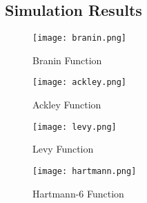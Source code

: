 \begin{appendices}
\chapter{Simulation Results}\label{ch:append-sims}
\begin{sidewaysfigure}[h]
\texttt{[image: branin.png]}
\caption{Branin Function}
\end{sidewaysfigure}
\begin{sidewaysfigure}[h]
\texttt{[image: ackley.png]}
\caption{Ackley Function}
\end{sidewaysfigure}
\begin{sidewaysfigure}[h]
\texttt{[image: levy.png]}
\caption{Levy Function}
\end{sidewaysfigure}
\begin{sidewaysfigure}[h]
\texttt{[image: hartmann.png]}
\caption{Hartmann-6 Function}
\end{sidewaysfigure}
\end{appendices}
